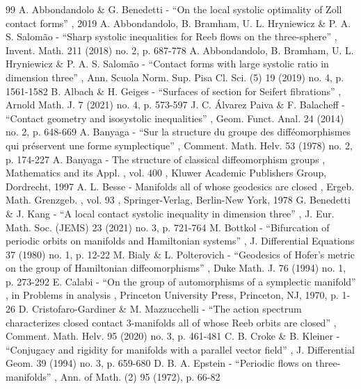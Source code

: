 \begin{thebibliography}{99}
 A. Abbondandolo \& G. Benedetti - “On the local systolic optimality of Zoll contact forms” , 2019
 A. Abbondandolo, B. Bramham, U. L. Hryniewicz \& P. A. S. Salomão - “Sharp systolic inequalities for Reeb flows on the three-sphere” , Invent. Math. 211 (2018) no. 2, p. 687-778
 A. Abbondandolo, B. Bramham, U. L. Hryniewicz \& P. A. S. Salomão - “Contact forms with large systolic ratio in dimension three” , Ann. Scuola Norm. Sup. Pisa Cl. Sci. (5) 19 (2019) no. 4, p. 1561-1582
 B. Albach \& H. Geiges - “Surfaces of section for Seifert fibrations” , Arnold Math. J. 7 (2021) no. 4, p. 573-597
 J. C. Álvarez Paiva \& F. Balacheff - “Contact geometry and isosystolic inequalities” , Geom. Funct. Anal. 24 (2014) no. 2, p. 648-669
 A. Banyaga - “Sur la structure du groupe des difféomorphismes qui préservent une forme symplectique” , Comment. Math. Helv. 53 (1978) no. 2, p. 174-227
 A. Banyaga - The structure of classical diffeomorphism groups , Mathematics and its Appl. , vol. 400 , Kluwer Academic Publishers Group, Dordrecht, 1997
 A. L. Besse - Manifolds all of whose geodesics are closed , Ergeb. Math. Grenzgeb. , vol. 93 , Springer-Verlag, Berlin-New York, 1978
 G. Benedetti \& J. Kang - “A local contact systolic inequality in dimension three” , J. Eur. Math. Soc. (JEMS) 23 (2021) no. 3, p. 721-764
 M. Bottkol - “Bifurcation of periodic orbits on manifolds and Hamiltonian systems” , J. Differential Equations 37 (1980) no. 1, p. 12-22
 M. Bialy \& L. Polterovich - “Geodesics of Hofer’s metric on the group of Hamiltonian diffeomorphisms” , Duke Math. J. 76 (1994) no. 1, p. 273-292
 E. Calabi - “On the group of automorphisms of a symplectic manifold” , in Problems in analysis , Princeton University Press, Princeton, NJ, 1970, p. 1-26
 D. Cristofaro-Gardiner \& M. Mazzucchelli - “The action spectrum characterizes closed contact 3-manifolds all of whose Reeb orbits are closed” , Comment. Math. Helv. 95 (2020) no. 3, p. 461-481
 C. B. Croke \& B. Kleiner - “Conjugacy and rigidity for manifolds with a parallel vector field” , J. Differential Geom. 39 (1994) no. 3, p. 659-680
 D. B. A. Epstein - “Periodic flows on three-manifolds” , Ann. of Math. (2) 95 (1972), p. 66-82

\end{thebibliography}
